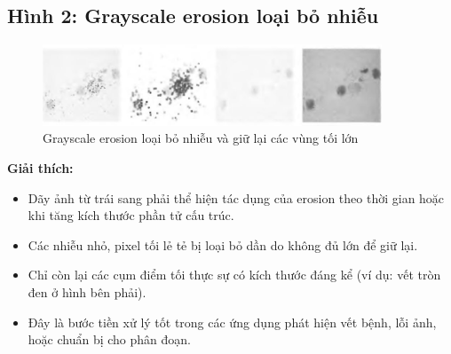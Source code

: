 \documentclass[12pt]{article}
\begin{document}
	\subsection{Hình 2: Grayscale erosion loại bỏ nhiễu}
	
	\begin{figure}[h!]
		\centering
		\includegraphics[width=0.9\textwidth]{images/31_2.png}
		\caption{Grayscale erosion loại bỏ nhiễu và giữ lại các vùng tối lớn}
		\label{fig:erosion_dots}
	\end{figure}
	
	\textbf{Giải thích:}
	\begin{itemize}
		\item Dãy ảnh từ trái sang phải thể hiện tác dụng của erosion theo thời gian hoặc khi tăng kích thước phần tử cấu trúc.
		\item Các nhiễu nhỏ, pixel tối lẻ tẻ bị loại bỏ dần do không đủ lớn để giữ lại.
		\item Chỉ còn lại các cụm điểm tối thực sự có kích thước đáng kể (ví dụ: vết tròn đen ở hình bên phải).
		\item Đây là bước tiền xử lý tốt trong các ứng dụng phát hiện vết bệnh, lỗi ảnh, hoặc chuẩn bị cho phân đoạn.
	\end{itemize}
	
\end{document}
